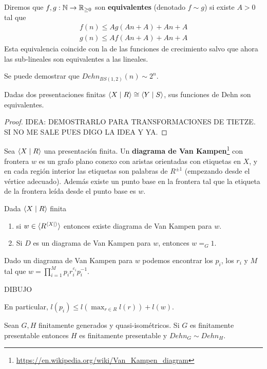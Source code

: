 \documentclass[twoside, 11pt]{article}
\begin{document}
Diremos que $f,g:\mathbb{N}\to\mathbb{R}_{\geq 0}$ son \textbf{equivalentes} (denotado $f\sim g$) si existe $A>0$ tal que
\begin{gather*}
f(n)\leq Ag(An+A)+An+A\\
g(n)\leq Af(An+A)+An+A
\end{gather*}
Esta equivalencia coincide con la de las funciones de crecimiento salvo que ahora las sub-lineales son equivalentes a las lineales. 

Se puede demostrar que $Dehn_{BS(1,2)}(n)\sim 2^n$.

\begin{lemma}
Dadas dos presentaciones finitas $\langle{X\mid R}\rangle\cong \langle{Y\mid S}\rangle$, sus funciones de Dehn son equivalentes.
\end{lemma}
\begin{proof}
IDEA: DEMOSTRARLO PARA TRANSFORMACIONES DE TIETZE. SI NO ME SALE PUES DIGO LA IDEA Y YA.
\end{proof}

Sea $\langle{X\mid R}\rangle$ una presentación finita. Un \textbf{diagrama de Van Kampen}\footnote{\url{https://en.wikipedia.org/wiki/Van_Kampen_diagram}} con frontera $w$ es un grafo plano conexo con aristas orientadas con etiquetas en $X$, y en cada región interior las etiquetas son palabras de $R^{\pm 1}$ (empezando desde el vértice adecuado). Además existe un punto base en la frontera tal que la etiqueta de la frontera leída desde el punto base es $w$. 

\begin{teorema}
Dada $\langle{X\mid R}\rangle$ finita
\begin{enumerate}
\item si $w\in \langle{R^{\langle{X\mid }\rangle}}\rangle$ entonces existe diagrama de Van Kampen para $w$.
\item Si $D$ es un diagrama de Van Kampen para $w$, entonces $w=_G 1$.
\end{enumerate}
\end{teorema}

\begin{observacion}
Dado un diagrama de Van Kampen para $w$ podemos encontrar los $p_i$, los $r_i$ y $M$ tal que $w=\prod_{i=1}^M p_i r_i^{\varepsilon_i} p_i^{-1}$.

DIBUJO

En particular, $l(p_i)\leq l(\max_{r\in R} l(r))+l(w)$.
\end{observacion}

\begin{teorema}
Sean $G,H$ finitamente generados y quasi-isométricos. Si $G$ es finitamente presentable entonces $H$ es finitamente presentable y $Dehn_G\sim Dehn_H$.
\end{teorema}
\end{document}
